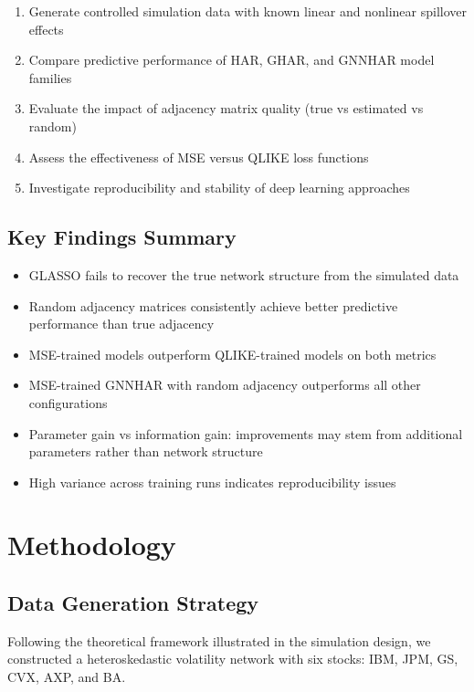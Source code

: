 \documentclass[10pt,a4paper]{article}
\begin{document}
\begin{enumerate}
\item Generate controlled simulation data with known linear and nonlinear spillover effects
\item Compare predictive performance of HAR, GHAR, and GNNHAR model families
\item Evaluate the impact of adjacency matrix quality (true vs estimated vs random)
\item Assess the effectiveness of MSE versus QLIKE loss functions
\item Investigate reproducibility and stability of deep learning approaches
\end{enumerate}

\subsection{Key Findings Summary}

\begin{itemize}
\item[\textbf{(i)}] GLASSO fails to recover the true network structure from the simulated data
\item[\textbf{(ii)}] Random adjacency matrices consistently achieve better predictive performance than true adjacency
\item[\textbf{(iii)}] MSE-trained models outperform QLIKE-trained models on both metrics
\item[\textbf{(iv)}] MSE-trained GNNHAR with random adjacency outperforms all other configurations
\item[\textbf{(v)}] Parameter gain vs information gain: improvements may stem from additional parameters rather than network structure
\item[\textbf{(vi)}] High variance across training runs indicates reproducibility issues
\end{itemize}

\section{Methodology}

\subsection{Data Generation Strategy}

Following the theoretical framework illustrated in the simulation design, we constructed a heteroskedastic volatility network with six stocks: IBM, JPM, GS, CVX, AXP, and BA.
\end{document}
